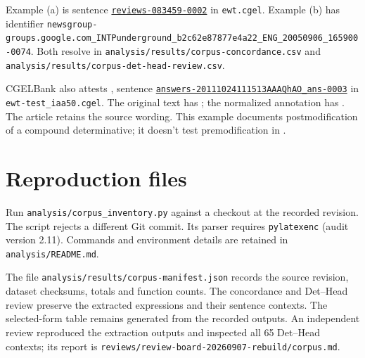 \documentclass[12pt]{article}
\begin{document}
Example (a) is sentence \href{https://github.com/nert-nlp/cgel/blob/d0a2c2d8c522b23d5aa879fc9cb94948f4285b2c/datasets/ewt.cgel\#L651-L654}{\nolinkurl{reviews-083459-0002}} in \nolinkurl{ewt.cgel}. Example (b) has identifier \nolinkurl{newsgroup-groups.google.com_INTPunderground_b2c62e87877e4a22_ENG_20050906_165900-0074}. Both resolve in \nolinkurl{analysis/results/corpus-concordance.csv} and \nolinkurl{analysis/results/corpus-det-head-review.csv}.

CGELBank also attests , sentence \href{https://github.com/nert-nlp/cgel/blob/d0a2c2d8c522b23d5aa879fc9cb94948f4285b2c/datasets/ewt-test_iaa50.cgel\#L179-L181}{\nolinkurl{answers-20111024111513AAAQhAO_ans-0003}} in \nolinkurl{ewt-test_iaa50.cgel}. The original text has ; the normalized annotation has . The article retains the source wording. This example documents postmodification of a compound determinative; it doesn't test premodification in .

\section{Reproduction files}

Run \nolinkurl{analysis/corpus_inventory.py} against a checkout at the recorded revision. The script rejects a different Git commit. Its parser requires \texttt{pylatexenc} (audit version 2.11). Commands and environment details are retained in \nolinkurl{analysis/README.md}.

The file \nolinkurl{analysis/results/corpus-manifest.json} records the source revision, dataset checksums, totals and function counts. The concordance and Det--Head review preserve the extracted expressions and their sentence contexts. The selected-form table remains generated from the recorded outputs. An independent review reproduced the extraction outputs and inspected all 65 Det--Head contexts; its report is \nolinkurl{reviews/review-board-20260907-rebuild/corpus.md}.

\printbibliography
\end{document}
